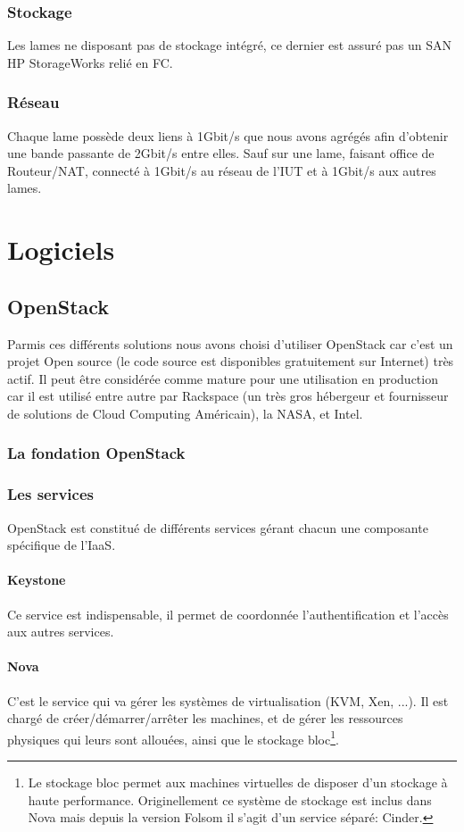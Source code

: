 \documentclass{report}
\begin{document}
\subsection{Stockage}
Les lames ne disposant pas de stockage intégré, ce dernier est assuré pas un SAN HP StorageWorks relié en FC.

\subsection{Réseau}
Chaque lame possède deux liens à 1Gbit/s que nous avons agrégés afin d'obtenir une bande passante de 2Gbit/s entre elles. Sauf sur une lame, faisant office de Routeur/NAT, connecté à 1Gbit/s au réseau de l'IUT et à 1Gbit/s aux autres lames.

\chapter{Logiciels}
\section{OpenStack}
Parmis ces différents solutions nous avons choisi d’utiliser OpenStack car c’est un projet Open source (le code source est disponibles gratuitement sur Internet) très actif.
Il peut être considérée comme mature pour une utilisation en production car il est utilisé entre autre par Rackspace (un très gros hébergeur et fournisseur de solutions de Cloud Computing Américain), la NASA, et Intel.

\subsection{La fondation OpenStack}


\subsection{Les services}
OpenStack est constitué de différents services gérant chacun une composante spécifique de l'IaaS.
\subsubsection{Keystone}
Ce service est indispensable, il permet de coordonnée l'authentification et l'accès aux autres services.

\subsubsection{Nova}
C'est le service qui va gérer les systèmes de virtualisation (KVM, Xen, ...). Il est chargé de créer/démarrer/arrêter les machines, et de gérer les ressources physiques qui leurs sont allouées, ainsi que le stockage bloc\footnote{Le stockage bloc permet aux machines virtuelles de disposer d'un stockage à haute performance. Originellement ce système de stockage est inclus dans Nova mais depuis la version Folsom il s'agit d'un service séparé: Cinder.}.
\end{document}
